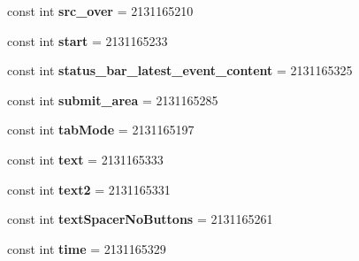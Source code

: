 \begin{DoxyCompactItemize}
\mbox{\label{class_pinned_app_1_1_droid_1_1_resource_1_1_id_a3593999568ff53e10796298b6c5e9ea1}} 
const int {\bfseries src\+\_\+over} = 2131165210
\item 
\mbox{\label{class_pinned_app_1_1_droid_1_1_resource_1_1_id_acb8d6dcc13382c97b620a34e3b54da14}} 
const int {\bfseries start} = 2131165233
\item 
\mbox{\label{class_pinned_app_1_1_droid_1_1_resource_1_1_id_ab65fdaf4a5acce8f24a3f6f87873f8bb}} 
const int {\bfseries status\+\_\+bar\+\_\+latest\+\_\+event\+\_\+content} = 2131165325
\item 
\mbox{\label{class_pinned_app_1_1_droid_1_1_resource_1_1_id_a5a7a8f735746a949cbfac3d79e191e63}} 
const int {\bfseries submit\+\_\+area} = 2131165285
\item 
\mbox{\label{class_pinned_app_1_1_droid_1_1_resource_1_1_id_aa1a56b5e7287e1c562d55bbebb764803}} 
const int {\bfseries tab\+Mode} = 2131165197
\item 
\mbox{\label{class_pinned_app_1_1_droid_1_1_resource_1_1_id_aba3b9864f40587ea5e842e04b9becfca}} 
const int {\bfseries text} = 2131165333
\item 
\mbox{\label{class_pinned_app_1_1_droid_1_1_resource_1_1_id_a52ff30cbf3058c7c64c3bef255932687}} 
const int {\bfseries text2} = 2131165331
\item 
\mbox{\label{class_pinned_app_1_1_droid_1_1_resource_1_1_id_a56ae2ef0d7bc5406e4790f485ea04d6c}} 
const int {\bfseries text\+Spacer\+No\+Buttons} = 2131165261
\item 
\mbox{\label{class_pinned_app_1_1_droid_1_1_resource_1_1_id_ace765bc80a8a396893a3df49dd7f4eff}} 
const int {\bfseries time} = 2131165329
\item 
\mbox{\label{class_pinned_app_1_1_droid_1_1_resource_1_1_id_abdf21958b844a6685f80436f64da2fdb}} 

\end{DoxyCompactItemize}
